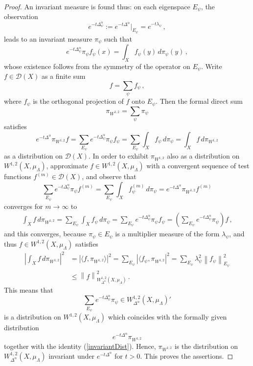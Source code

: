 \documentclass[a4paper,draft]{ZbRad}
\theoremstyle{plain}
\theoremstyle{definition}
\numberwithin{equation}{section}
\renewcommand{\le}{\leqslant}\renewcommand{\leq}{\leqslant}
\newcommand{\absolute}[1]{\left\lvert#1\right\rvert}
\newcommand{\norm}[1]{\left\|#1\right\|}
\begin{document}
\begin{proof}
\smallskip
An invariant measure is found thus: on each eigenspace $E_\psi$, the observation
\[
e^{-t\Delta^\alpha_\psi} := 
e^{-t\Delta^\alpha}|_{E_\psi} 
= e^{-t\lambda_\psi}\,,
\]
leads to an invariant measure $\pi_\psi$ such that
\[
e^{-t\Delta_\psi^\alpha}\pi_\psi f_\psi(x)
=\int_X f_\psi(y)\,d\pi_\psi(y)\,,
\]
whose existence follows from the symmetry of the operator on $E_\psi$. Write
$f\in\mathcal{D}(X)$ as a finite sum
\[
f=\sum\limits_\psi f_\psi\,,
\]
where $f_\psi$ is the orthogonal projection of $f$ onto $E_\psi$. Then the formal direct
sum
\[
\pi_{W^{1,2}}=\sum\limits_\psi\pi_\psi
\]
satisfies
\[
e^{-t\Delta^\alpha}\pi_{W^{1,2}}f
=\sum\limits_{E_\psi}
e^{-t\Delta^\alpha_\psi}\pi_\psi f_\psi
=\sum\limits_{E_\psi}\int_X f_\psi\,d\pi_\psi
=\int_X f\,d\pi_{W^{1,2}}
\]
as a distribution on $\mathcal{D}(X)$. In order to exhibit $\pi_{W^{1,2}}$ also as a distribution on
$W^{1,2}(X,\mu_\Lambda)$, approximate $f\in W^{1,2}(X,\mu_\Lambda)$ with a convergent sequence of
test functions $f^{(m)} \in\mathcal{D}(X)$, and observe that
\[
\sum\limits_{E_\psi}e^{-t\Delta_\psi^\alpha}\pi_\psi f^{(m)}
=\sum\limits_{E_\psi}\int_X f_\psi^{(m)}\,d\pi_\psi
=e^{-t\Delta^\alpha}\pi_{W^{1,2}}f^{(m)}
\]
converges for $m\to\infty$ to
\begin{align}\label{invariantDist}
\int_X f\,d\pi_{W^{1,2}}
=\sum\limits_{E_\psi}\int_X f_\psi\,d\pi_\psi
= \sum\limits_{E_\psi} e^{-t\Delta^\alpha_\psi}\pi_\psi f_\psi
= \left(\sum\limits_{E_\psi}e^{-t\Delta_\psi^\alpha}\pi_\psi\right)f\,,
\end{align}
and this converges, because $\pi_\psi\in E_\psi$ is a multiplier measure of the form 
$\lambda_\psi$,
and thus $f \in W^{1,2}(X,\mu_\Lambda)$ satisfies
\begin{align*}
\absolute{\int_X f\,d\pi_{W^{1,2}}}^2
&=\absolute{\langle f,\pi_{W^{1,2}} \rangle}^2
=\sum\limits_{E_\psi} \absolute{\langle f_\psi,\pi_{W^{1,2}}}^2
=\sum\limits_{E_\psi} \lambda_\psi^2\norm{f_\psi}^2_{E_\psi}
\\
&\le \norm{f}^2_{W^{1,2}_{\Delta^\alpha}(X,\mu_\Lambda)}\,.
\end{align*}
This means that
\[
\sum\limits_{E_\psi}e^{-t\Delta^\alpha_\psi}\pi_\psi\in W^{1,2}_{\Delta^\alpha}(X,\mu_\Lambda)'
\]
is a distribution on $W^{1,2}(X,\mu_\Lambda)$ which coincides with the formally given
distribution
\[
e^{-t\Delta^\alpha}\pi_{W^{1,2}}
\]
together with the identity (\ref{invariantDist}). Hence, $\pi_{W^{1,2}}$ is the distribution on $W^{1,2}_{\Delta^\alpha}(X,\mu_\Lambda)$
invariant under $e^{-t\Delta^\alpha}$ for $t > 0$. This proves the assertions.
\end{proof}
\end{document}
